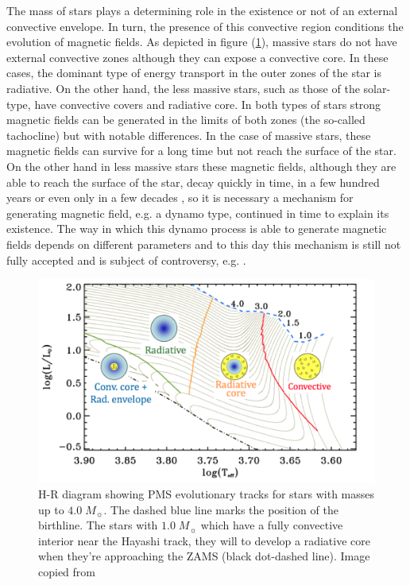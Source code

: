 \documentclass[fleqn,usenatbib]{mnras}
\begin{document}
The mass of stars plays a determining role in the existence or not of an external convective envelope. In turn, the presence of this convective region conditions the evolution of magnetic fields. As depicted in figure (\ref{fig:hr_hussain}), massive stars do not have external convective zones although they can expose a convective core. In these cases, the dominant type of energy transport in the outer zones of the star is radiative. On the other hand, the less massive stars, such as those of the solar-type, have convective covers and radiative core. In both types of stars strong magnetic fields can be generated in the limits of both zones (the so-called tachocline) but with notable differences. In the case of massive stars, these magnetic fields can survive for a long time but not reach the surface of the star. On the other hand in less massive stars these magnetic fields, although they are able to reach the surface of the star, decay quickly in time, in a few hundred years or even only in a few decades \citep{Chabrier2006}, so it is necessary a mechanism for generating magnetic field, e.g. a dynamo type, continued in time to explain its existence. The way in which this dynamo process is able to generate magnetic fields depends on different parameters and to this day this mechanism is still not fully accepted and is subject of controversy, e.g. \citep{Charbonneau2010}.\par

\begin{figure}
	\includegraphics[width=\columnwidth]{figures/hussain_gaitee_fig1.png}
    \caption{H-R diagram showing PMS evolutionary tracks for stars with masses up to $4.0 \; M_{\sun}$. The dashed blue line marks the position of the birthline. The stars with $1.0 \; M_{\sun}$ which have a fully convective interior near the Hayashi track, they will to develop a radiative core when they're approaching the ZAMS (black dot-dashed line). Image copied from \citet{Hussain2014}}
    \label{fig:hr_hussain}
\end{figure}
\end{document}
